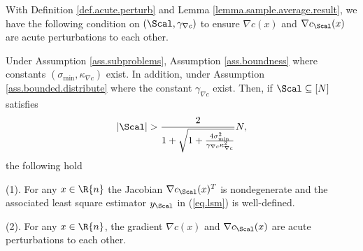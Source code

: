 
With Definition \ref{def.acute.perturb} and Lemma \ref{lemma.sample.average.result}, we have the following condition on $(\Scal,\gamma_{\nabla c})$ to ensure $\nabla c(x)$ and $\nabla c_{\Scal}(x)$ are acute perturbations to each other.

\begin{lemma}
\label{lemma.acute.perturb}
	Under Assumption \ref{ass.subproblems}, Assumption \ref{ass.boundness} where constants $(\sigma_{\min},\kappa_{\nabla c})$ exist. In addition, under Assumption \ref{ass.bounded.distribute} where the constant $\gamma_{\nabla c}$ exist. Then, if $\Scal\subseteq[N]$ satisfies 
	\[
	|\Scal|>\frac{2}{1+\sqrt{1+\frac{4\sigma_{\min}^2}{\gamma_{\nabla c}\kappa_{\nabla c}^2}}}N ,
	\]
	the following hold 
	\bitemize 
	\item[(1).]For any $x\in\R{n}$ the Jacobian $\nabla c_{\Scal}(x)^T$ is nondegenerate and the associated least square estimator $y_{\Scal}$ in (\ref{eq.lsm}) is well-defined.
	\item[(2).] For any $x\in\R{n}$, the gradient $\nabla c(x)$ and $\nabla c_{\Scal}(x)$ are acute perturbations to each other.	
	\eitemize
\end{lemma}

